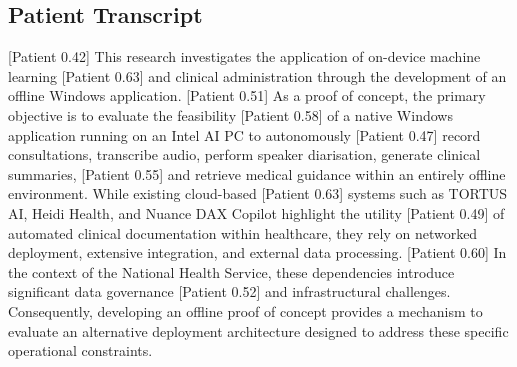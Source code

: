 \subsection*{Patient Transcript}
\noindent
{[Patient 0.42]} This research investigates the application of on-device machine learning \newline
{[Patient 0.63]} and clinical administration through the development of an offline Windows application. \newline
{[Patient 0.51]} As a proof of concept, the primary objective is to evaluate the feasibility \newline
{[Patient 0.58]} of a native Windows application running on an Intel AI PC to autonomously \newline
{[Patient 0.47]} record consultations, transcribe audio, perform speaker diarisation, generate clinical summaries, \newline
{[Patient 0.55]} and retrieve medical guidance within an entirely offline environment. While existing cloud-based \newline
{[Patient 0.63]} systems such as TORTUS AI, Heidi Health, and Nuance DAX Copilot highlight the utility \newline
{[Patient 0.49]} of automated clinical documentation within healthcare, they rely on networked deployment, extensive integration, and external data processing. \newline
{[Patient 0.60]} In the context of the National Health Service, these dependencies introduce significant data governance \newline
{[Patient 0.52]} and infrastructural challenges. Consequently, developing an offline proof of concept provides a mechanism to evaluate an alternative deployment architecture designed to address these specific operational constraints.